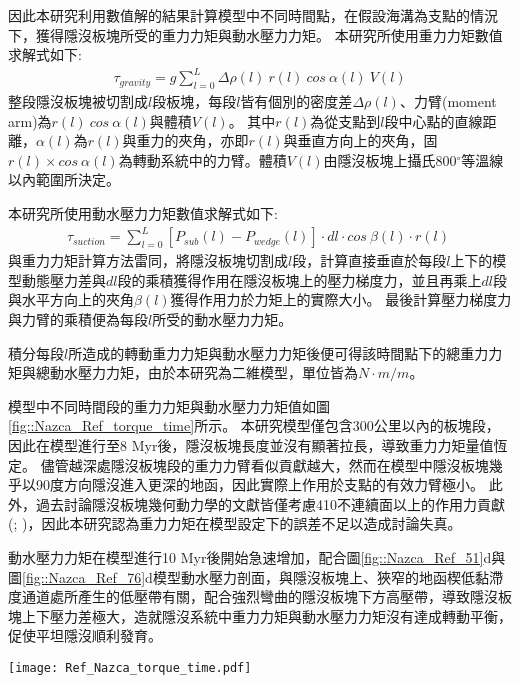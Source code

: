因此本研究利用數值解的結果計算模型中不同時間點，在假設海溝為支點的情況下，獲得隱沒板塊所受的重力力矩與動水壓力力矩。
本研究所使用重力力矩數值求解式如下:
\begin{align}
    \tau_{gravity} =  g\sum ^L_{l=0} \Delta \rho(l)\ r(l)\ cos\ \alpha (l)\ V(l) 
    \label{eqn:tau_gravity}
\end{align}
整段隱沒板塊被切割成$l$段板塊，每段$l$皆有個別的密度差$\Delta \rho(l)$、力臂(moment arm)為$r(l)\ cos\ \alpha (l)$與體積$V(l)$。
其中$r(l)$為從支點到$l$段中心點的直線距離，$ \alpha (l)$為$r(l)$與重力的夾角，亦即$r(l)$與垂直方向上的夾角，固$r(l)\times cos\ \alpha (l)$為轉動系統中的力臂。體積$V(l)$由隱沒板塊上攝氏800$^{\circ}$等溫線以內範圍所決定。

本研究所使用動水壓力力矩數值求解式如下:
\begin{align}
    \tau_{suction} =  \sum ^L_{l=0} [P_{sub}(l)-P_{wedge}(l)]\cdot dl \cdot cos\ \beta(l)\cdot r(l)\ 
    \label{eqn:tau_suction}
\end{align}
與重力力矩計算方法雷同，將隱沒板塊切割成$l$段，計算直接垂直於每段$l$上下的模型動態壓力差與$dl$段的乘積獲得作用在隱沒板塊上的壓力梯度力，並且再乘上$dl$段與水平方向上的夾角$\beta(l)$獲得作用力於力矩上的實際大小。
最後計算壓力梯度力與力臂的乘積便為每段$l$所受的動水壓力力矩。

積分每段$l$所造成的轉動重力力矩與動水壓力力矩後便可得該時間點下的總重力力矩與總動水壓力力矩，由於本研究為二維模型，單位皆為$N\cdot m/m$。

模型中不同時間段的重力力矩與動水壓力力矩值如圖\ref{fig::Nazca_Ref_torque_time}所示。
本研究模型僅包含300公里以內的板塊段，因此在模型進行至8 Myr後，隱沒板塊長度並沒有顯著拉長，導致重力力矩量值恆定。
儘管越深處隱沒板塊段的重力力臂看似貢獻越大，然而在模型中隱沒板塊幾乎以90度方向隱沒進入更深的地函，因此實際上作用於支點的有效力臂極小。
此外，過去討論隱沒板塊幾何動力學的文獻皆僅考慮410不連續面以上的作用力貢獻(\citealp{schellart2004quantifying}; \citealp{billen2008modeling})，因此本研究認為重力力矩在模型設定下的誤差不足以造成討論失真。

動水壓力力矩在模型進行10 Myr後開始急速增加，配合圖\ref{fig::Nazca_Ref_51}d與圖\ref{fig::Nazca_Ref_76}d模型動水壓力剖面，與隱沒板塊上、狹窄的地函楔低黏滯度通道處所產生的低壓帶有關，配合強烈彎曲的隱沒板塊下方高壓帶，導致隱沒板塊上下壓力差極大，造就隱沒系統中重力力矩與動水壓力力矩沒有達成轉動平衡，促使平坦隱沒順利發育。

\begin{figure*}[hb]
    \centering
    \texttt{[image: Ref\_Nazca\_torque\_time.pdf]}
    \caption[納茲卡參考模型重力力矩與動水壓力力矩隨時間變化]{納茲卡參考模型重力力矩與動水壓力力矩隨時間變化。}
    \label{fig::Nazca_Ref_torque_time}
\end{figure*}


